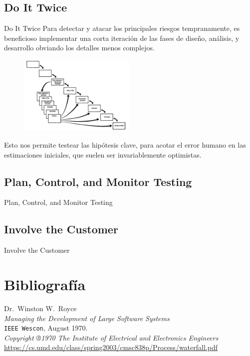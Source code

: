\documentclass{beamer}
\begin{document}
\subsection{Do It Twice}
\begin{frame}{Do It Twice}
Para detectar y atacar los principales riesgos tempranamente, es beneficioso implementar una corta iteración de las fases de diseño, análisis, y desarrollo obviando los detalles menos complejos.

\begin{figure}
\includegraphics[width=0.5\textwidth]{figures/hazloDosVeces.png}
\end{figure}

Esto nos permite testear las hipótesis clave, para acotar el error humano en las estimaciones iniciales, que suelen ser invariablemente optimistas.

\end{frame}

\subsection{Plan, Control, and Monitor Testing}

\begin{frame}{Plan, Control, and Monitor Testing}

\end{frame}


\subsection{Involve the Customer}

\begin{frame}{Involve the Customer}

\end{frame}


\section{Bibliografía}

\begin{frame}[fragile]
\begin{thebibliography}{9}
  \footnotesize
  Dr.\ Winston W.\ Royce \\
  \emph{Managing the Development of Large Software Systems} \\
  \texttt{IEEE Wescon},
  August 1970. \\
  \textit{Copyright ®1970 The Institute of Electrical and Electronics Engineers} \\
  {\scriptsize\url{https://cs.umd.edu/class/spring2003/cmsc838p/Process/waterfall.pdf}}
\end{thebibliography}
\end{frame}
\end{document}
